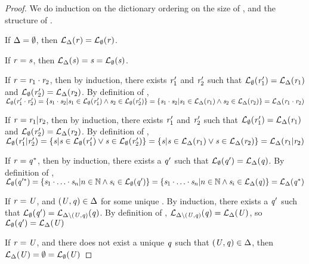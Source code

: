 \ecrc*
\begin{proof}
We do induction on the dictionary ordering on the size of \RegexContext{},
and the structure of \Regex{}.

If $\Delta=\emptyset$, then $\mathcal{L}_{\Delta}(\mathit{r}) =
\mathcal{L}_{\emptyset}(\mathit{r})$.

If $\mathit{r}=\mathit{s}$, then $\mathcal{L}_{\Delta}(\mathit{s}) = \mathit{s} =
\mathcal{L}_{\emptyset}(\mathit{s})$.

If $\mathit{r}=\mathit{r}_1\cdot\mathit{r}_2$, then by induction, there exists
$\mathit{r}_1'$ and $\mathit{r}_2'$ such that
$\mathcal{L}_{\emptyset}(\mathit{r}_1')=\mathcal{L}_{\Delta}(\mathit{r}_1)$
and $\mathcal{L}_{\emptyset}(\mathit{r}_2')=\mathcal{L}_{\Delta}(\mathit{r}_2)$.
By definition of \Language{},
$\mathcal{L}_{\emptyset}(\mathit{r}_1'\cdot\mathit{r}_2')=
\{\mathit{s}_1\cdot\mathit{s}_2 | \mathit{s}_1\in\mathcal{L}_{\emptyset}(\mathit{r}_1') \wedge \mathit{s}_2\in\mathcal{L}_{\emptyset}(\mathit{r}_2')\}=
\{\mathit{s}_1\cdot\mathit{s}_2 | \mathit{s}_1\in\mathcal{L}_{\Delta}(\mathit{r}_1) \wedge \mathit{s}_2\in\mathcal{L}_{\Delta}(\mathit{r}_2)\}=
\mathcal{L}_{\Delta}(\mathit{r}_1\cdot\mathit{r}_2)$

If $\mathit{r}=\mathit{r}_1|\mathit{r}_2$, then by induction, there exists
$\mathit{r}_1'$ and $\mathit{r}_2'$ such that
$\mathcal{L}_{\emptyset}(\mathit{r}_1')=\mathcal{L}_{\Delta}(\mathit{r}_1)$
and $\mathcal{L}_{\emptyset}(\mathit{r}_2')=\mathcal{L}_{\Delta}(\mathit{r}_2)$.
By definition of \Language{},
$\mathcal{L}_{\emptyset}(\mathit{r}_1'|\mathit{r}_2')=
\{\mathit{s} | \mathit{s}\in\mathcal{L}_{\emptyset}(\mathit{r}_1') \vee \mathit{s}\in\mathcal{L}_{\emptyset}(\mathit{r}_2')\}=
\{\mathit{s} | \mathit{s}\in\mathcal{L}_{\Delta}(\mathit{r}_1) \vee \mathit{s}\in\mathcal{L}_{\Delta}(\mathit{r}_2)\}=
\mathcal{L}_{\Delta}(\mathit{r}_1|\mathit{r}_2)$

If $\mathit{r}=\mathit{q}^*$, then by induction, there exists a
$\mathit{q}'$ such that
$\mathcal{L}_{\emptyset}(\mathit{q}')=\mathcal{L}_{\Delta}(\mathit{q})$.
By definition of \Language{},
$\mathcal{L}_{\emptyset}(\mathit{q}'^*)=
\{\mathit{s}_1\cdot\ldots\cdot\mathit{s}_n | n\in\mathbb{N} \wedge \mathit{s}_i\in\mathcal{L}_{\emptyset}(\mathit{q}')\}=
\{\mathit{s}_1\cdot\ldots\cdot\mathit{s}_n | n\in\mathbb{N} \wedge \mathit{s}_i\in\mathcal{L}_{\Delta}(\mathit{q})\}=
\mathcal{L}_{\Delta}(\mathit{q}^*)$

If $\mathit{r}=\mathit{U}$, and $(\mathit{U},\mathit{q})\in\Delta$ for
some unique \RegexAlt{}.
By induction, there exists a $\mathit{q}'$ such that
$\mathcal{L}_{\emptyset}(\mathit{q}')=\mathcal{L}_{\Delta\setminus(\mathit{U},\mathit{q})}(\mathit{q})$.
By definition of \Language{}, $\mathcal{L}_{\Delta\setminus(\mathit{U},\mathit{q})}(\mathit{q})=\mathcal{L}_{\Delta}(\mathit{U})$, so 
$\mathcal{L}_{\emptyset}(\mathit{q}')=\mathcal{L}_{\Delta}(\mathit{U})$

If $\mathit{r}=\mathit{U}$, and there does not exist a unique $\mathit{q}$ such that
$(\mathit{U},\mathit{q})\in\Delta$, then
$\mathcal{L}_{\Delta}(\mathit{U})=\emptyset=\mathcal{L}_{\emptyset}(\mathit{U})$
\end{proof}

